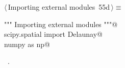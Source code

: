 \documentclass[11pt,oneside]{article}    %
\begin{document}
\begin{flushleft} \small \label{scrap100}
\protect{}$\langle\,$Importing external modules\nobreak\ {\footnotesize 55d}$\,\rangle\equiv$
\vspace{-1ex}
\begin{list}{}{} \item
\mbox{}\verb@""" Importing external modules """@\\
\mbox{}\verb@from scipy.spatial import Delaunay@\\
\mbox{}\verb@import numpy as np@\\
\mbox{}\verb@@{\NWsep}
\end{list}
\vspace{-1ex}
\footnotesize\addtolength{\baselineskip}{-1ex}
\begin{list}{}{\setlength{\itemsep}{-\parsep}\setlength{\itemindent}{-\leftmargin}}
\item \NWtxtMacroRefIn\ .
\end{list}
\end{flushleft}
\end{document}
